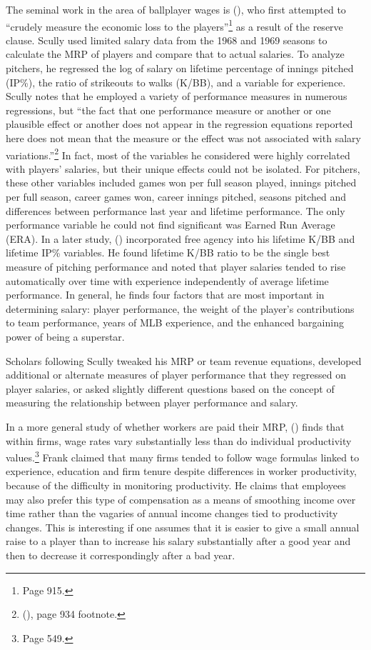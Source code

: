 \documentclass[12pt]{article}
\newcommand{\citee}[1]{\citename{#1} (\citeyear{#1})}
\begin{document}
The seminal work in the area of ballplayer wages is \citee{scully1974}, who first attempted to ``crudely measure the economic loss to the players''\footnote{Page 915.} as a result of the reserve clause.  Scully used limited salary data from the 1968 and 1969 seasons to calculate the MRP of players and compare that to actual salaries.  To analyze pitchers, he regressed the log of salary on lifetime percentage of innings pitched (IP\%), the ratio of strikeouts to walks (K/BB), and a variable for experience.  Scully notes that he employed a variety of performance measures in numerous regressions, but ``the fact that one performance measure or another or one plausible effect or another does not appear in the regression equations reported here does not mean that the measure or the effect was not associated with salary variations.''\footnote{\citee{scully1974}, page 934 footnote.} In fact, most of the variables he considered were highly correlated with players' salaries, but their unique effects could not be isolated.  For pitchers, these other variables included games won per full season played, innings pitched per full season, career games won, career innings pitched, seasons pitched and differences between performance last year and lifetime performance.  The only performance variable he could not find significant was Earned Run Average (ERA).  In a later study, \citee{scully1989} incorporated free agency into his lifetime K/BB and lifetime IP\% variables.  He found lifetime K/BB ratio to be the single best measure of pitching performance and noted that player salaries tended to rise automatically over time with experience independently of average lifetime performance.  In general, he finds four factors that are most important in determining salary: player performance, the weight of the player's contributions to team performance, years of MLB experience, and the enhanced bargaining power of being a superstar.

Scholars following Scully tweaked his MRP or team revenue equations, developed additional or alternate measures of player performance that they regressed on player salaries, or asked slightly different questions based on the concept of measuring the relationship between player performance and salary.

In a more general study of whether workers are paid their MRP, \citee{frank1984} finds that within firms, wage rates vary substantially less than do individual productivity values.\footnote{Page 549.}  Frank claimed that many firms tended to follow wage formulas linked to experience, education and firm tenure despite differences in worker productivity, because of the difficulty in monitoring productivity.  He claims that employees may also prefer this type of compensation as a means of smoothing income over time rather than the vagaries of annual income changes tied to productivity changes.  This is interesting if one assumes that it is easier to give a small annual raise to a player than to increase his salary substantially after a good year and then to decrease it correspondingly after a bad year.
\end{document}
